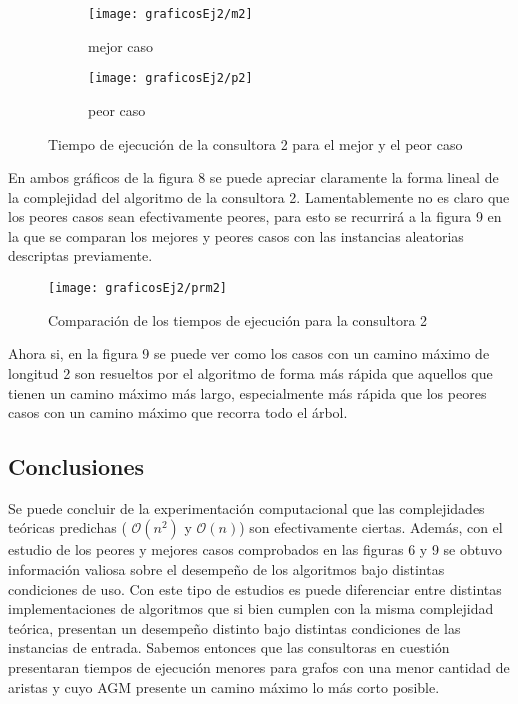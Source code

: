 \documentclass[A4paper,oneside,fleqn,11pt]{article}
\theoremstyle{definition}
\begin{document}
\begin{figure}[H] %
    \begin{subfigure}[b]{0.45\textwidth}
        \texttt{[image: graficosEj2/m2]}
        \caption[center]{mejor caso}
        \label{ni se pa que sirve esto}
    \end{subfigure}
    \begin{subfigure}[b]{0.45\textwidth}
        \texttt{[image: graficosEj2/p2]}
        \caption{peor caso}
        \label{ni se pa que sirve esto}
    \end{subfigure}
    \caption{Tiempo de ejecución de la consultora 2 para el mejor y el peor caso}
\end{figure}

En ambos gráficos de la figura 8 se puede apreciar claramente la forma lineal de la complejidad del algoritmo de la consultora 2. Lamentablemente no es claro que los peores casos sean efectivamente peores, para esto se recurrirá a la figura 9 en la que se comparan los mejores y peores casos con las instancias aleatorias descriptas previamente.

\begin{figure}[H] %
    \texttt{[image: graficosEj2/prm2]}
    \label{ni se pa que sirve esto}
    \caption{Comparación de los tiempos de ejecución para la consultora 2}
\end{figure}

Ahora si, en la figura 9 se puede ver como los casos con un camino máximo de longitud 2 son resueltos por el algoritmo de forma más rápida que aquellos que tienen un camino máximo más largo, especialmente más rápida que los peores casos con un camino máximo que recorra todo el árbol.

\subsection{Conclusiones}

Se puede concluir de la experimentación computacional que las complejidades teóricas predichas ( $\mathcal{O} (n^2)$ y  $\mathcal{O} (n)$)  son efectivamente ciertas. Además, con el estudio de los peores y mejores casos comprobados en las figuras 6 y 9 se obtuvo información valiosa sobre el desempeño de los algoritmos bajo distintas condiciones de uso. Con este tipo de estudios es puede diferenciar entre distintas implementaciones de algoritmos que si bien cumplen con la misma complejidad teórica, presentan un desempeño distinto bajo distintas condiciones de las instancias de entrada. Sabemos entonces que las consultoras en cuestión presentaran tiempos de ejecución menores para grafos con una menor cantidad de aristas y cuyo AGM presente un camino máximo lo más corto posible.
\end{document}
